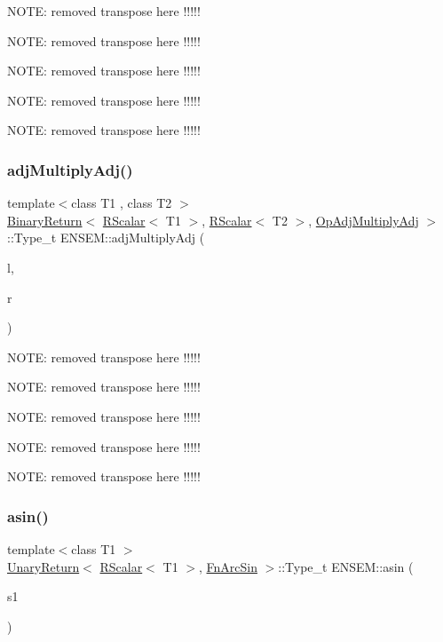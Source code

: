 N\+O\+TE\+: removed transpose here !!!!!

N\+O\+TE\+: removed transpose here !!!!!

N\+O\+TE\+: removed transpose here !!!!!

N\+O\+TE\+: removed transpose here !!!!!

N\+O\+TE\+: removed transpose here !!!!! \mbox{\label{group__rscalar_ga98ba0296fc190036d2587357efbd8ca2}} 
\subsubsection{\texorpdfstring{adjMultiplyAdj()}{adjMultiplyAdj()}}
{\footnotesize\ttfamily template$<$class T1 , class T2 $>$ \\
\mbox{\hyperlink{structENSEM_1_1BinaryReturn}{Binary\+Return}}$<$ \mbox{\hyperlink{classENSEM_1_1RScalar}{R\+Scalar}}$<$ T1 $>$, \mbox{\hyperlink{classENSEM_1_1RScalar}{R\+Scalar}}$<$ T2 $>$, \mbox{\hyperlink{structENSEM_1_1OpAdjMultiplyAdj}{Op\+Adj\+Multiply\+Adj}} $>$\+::Type\+\_\+t E\+N\+S\+E\+M\+::adj\+Multiply\+Adj (\begin{DoxyParamCaption}\item[{const \mbox{\hyperlink{classENSEM_1_1RScalar}{R\+Scalar}}$<$ T1 $>$ \&}]{l,  }\item[{const \mbox{\hyperlink{classENSEM_1_1RScalar}{R\+Scalar}}$<$ T2 $>$ \&}]{r }\end{DoxyParamCaption})\hspace{0.3cm}{\ttfamily [inline]}}

N\+O\+TE\+: removed transpose here !!!!!

N\+O\+TE\+: removed transpose here !!!!!

N\+O\+TE\+: removed transpose here !!!!!

N\+O\+TE\+: removed transpose here !!!!!

N\+O\+TE\+: removed transpose here !!!!! \mbox{\label{group__rscalar_ga74e5212c5ef434f0f0f94bf61b79f0fb}} 
\subsubsection{\texorpdfstring{asin()}{asin()}}
{\footnotesize\ttfamily template$<$class T1 $>$ \\
\mbox{\hyperlink{structENSEM_1_1UnaryReturn}{Unary\+Return}}$<$ \mbox{\hyperlink{classENSEM_1_1RScalar}{R\+Scalar}}$<$ T1 $>$, \mbox{\hyperlink{structENSEM_1_1FnArcSin}{Fn\+Arc\+Sin}} $>$\+::Type\+\_\+t E\+N\+S\+E\+M\+::asin (\begin{DoxyParamCaption}\item[{const \mbox{\hyperlink{classENSEM_1_1RScalar}{R\+Scalar}}$<$ T1 $>$ \&}]{s1 }\end{DoxyParamCaption})\hspace{0.3cm}{\ttfamily [inline]}}

